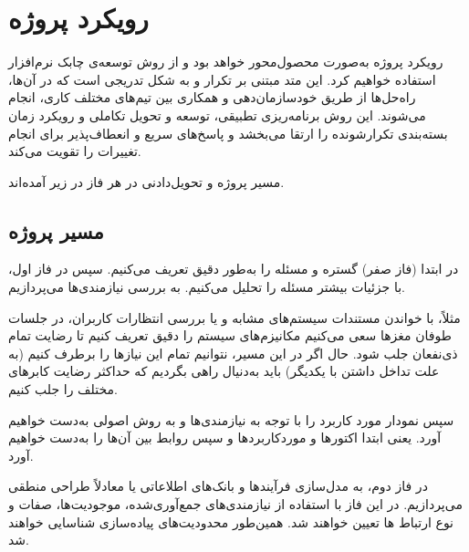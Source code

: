 


\chapter{
	رویکرد پروژه 
}



رویکرد پروژه به‌صورت محصول‌محور
خواهد بود و از روش توسعه‌ی چابک نرم‌افزار 
استفاده خواهیم کرد. 
این متد مبتنی بر تکرار و به شکل تدریجی است که در آن‌ها، راه‌حل‌ها از طریق خودسازمان‌دهی و همکاری بین تیم‌های مختلف کاری، انجام می‌شوند. این روش برنامه‌ریزی تطبیقی، توسعه و تحویل تکاملی و رویکرد زمان بسته‌بندی تکرارشونده را ارتقا می‌بخشد و پاسخ‌های سریع و انعطاف‌پذیر برای انجام تغییرات را تقویت می‌کند. 

مسیر پروژه و تحویل‌دادنی در هر فاز در زیر آمده‌اند.

\section{مسیر پروژه}
در ابتدا (فاز صفر) گستره و مسئله را به‌طور دقیق تعریف می‌کنیم. سپس در فاز اول، با جزئیات بیشتر مسئله را تحلیل می‌کنیم. 
به بررسی نیازمندی‌ها 
می‌پردازیم. 

مثلاً، با خواندن مستندات سیستم‌های مشابه و یا بررسی انتظارات کاربران، در جلسات طوفان مغزها سعی می‌کنیم مکانیزم‌های سیستم را دقیق تعریف کنیم تا رضایت تمام ذی‌نفعان جلب شود. حال اگر در این مسیر، نتوانیم تمام این نیازها را برطرف کنیم (به علت تداخل داشتن با یکدیگر) باید به‌دنیال راهی بگردیم که حداکثر رضایت کابرهای مختلف را جلب کنیم. 

سپس نمودار مورد کاربرد را با توجه به نیازمندی‌ها و به روش اصولی به‌دست خواهیم آورد. یعنی ابتدا اکتورها و موردکاربردها و سپس روابط بین آن‌ها را به‌دست خواهیم آورد.

در فاز دوم، به مدل‌سازی فرآیندها و بانک‌های اطلاعاتی یا معادلاً طراحی منطقی 
می‌پردازیم. در این فاز با استفاده از نیازمندی‌های جمع‌آوری‌شده، موجودیت‌ها، صفات و نوع ارتباط ها تعیین خواهند شد. 
همین‌طور محدودیت‌های پیاده‌سازی شناسایی خواهند شد.



